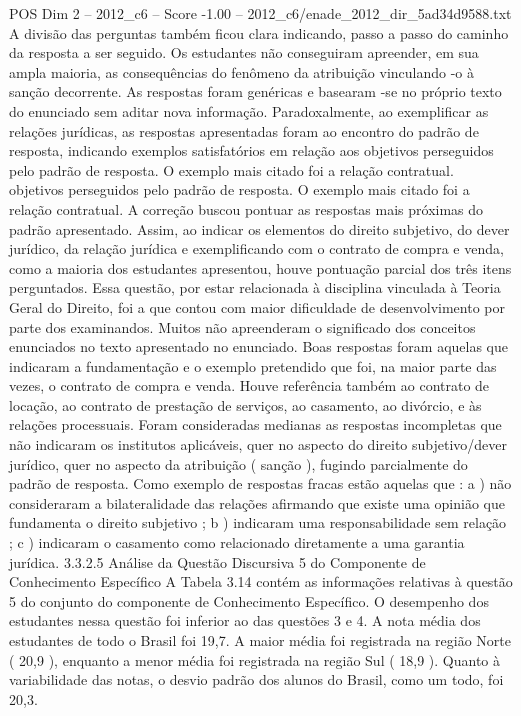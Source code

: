 \begin{textsample}{POS Dim 2 – 2012\_c6 – Score -1.00 – 2012\_c6/enade\_2012\_dir\_5ad34d9588.txt}
A divisão das perguntas também ficou clara indicando, passo a passo do caminho da resposta a ser seguido.
Os estudantes não conseguiram apreender, em sua ampla maioria, as consequências do fenômeno da atribuição vinculando -o à sanção decorrente.
As respostas foram genéricas e basearam -se no próprio texto do enunciado sem aditar nova informação.
Paradoxalmente, ao exemplificar as relações jurídicas, as respostas apresentadas foram ao encontro do padrão de resposta, indicando exemplos satisfatórios em relação aos objetivos perseguidos pelo padrão de resposta.
O exemplo mais citado foi a relação contratual. objetivos perseguidos pelo padrão de resposta.
O exemplo mais citado foi a relação contratual.
A correção buscou pontuar as respostas mais próximas do padrão apresentado.
Assim, ao indicar os elementos do direito subjetivo, do dever jurídico, da relação jurídica e exemplificando com o contrato de compra e venda, como a maioria dos estudantes apresentou, houve pontuação parcial dos três itens perguntados.
Essa questão, por estar relacionada à disciplina vinculada à Teoria Geral do Direito, foi a que contou com maior dificuldade de desenvolvimento por parte dos examinandos.
Muitos não apreenderam o significado dos conceitos enunciados no texto apresentado no enunciado.
Boas respostas foram aquelas que indicaram a fundamentação e o exemplo pretendido que foi, na maior parte das vezes, o contrato de compra e venda.
Houve referência também ao contrato de locação, ao contrato de prestação de serviços, ao casamento, ao divórcio, e às relações processuais.
Foram consideradas medianas as respostas incompletas que não indicaram os institutos aplicáveis, quer no aspecto do direito subjetivo/dever jurídico, quer no aspecto da atribuição ( sanção ), fugindo parcialmente do padrão de resposta.
Como exemplo de respostas fracas estão aquelas que : a ) não consideraram a bilateralidade das relações afirmando que existe uma opinião que fundamenta o direito subjetivo ; b ) indicaram uma responsabilidade sem relação ; c ) indicaram o casamento como relacionado diretamente a uma garantia jurídica. 3.3.2.5 Análise da Questão Discursiva 5 do Componente de Conhecimento Específico A Tabela 3.14 contém as informações relativas à questão 5 do conjunto do componente de Conhecimento Específico.
O desempenho dos estudantes nessa questão foi inferior ao das questões 3 e 4.
A nota média dos estudantes de todo o Brasil foi 19,7.
A maior média foi registrada na região Norte ( 20,9 ), enquanto a menor média foi registrada na região Sul ( 18,9 ).
Quanto à variabilidade das notas, o desvio padrão dos alunos do Brasil, como um todo, foi 20,3.

\end{textsample}

